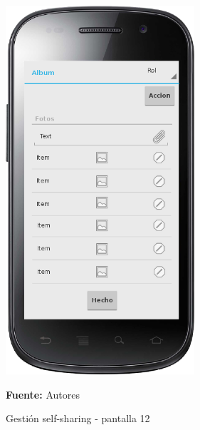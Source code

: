 \begin{figure}[!htb]
  \begin{center}
    \includegraphics[width=7cm]{./imagenes/UI/Self_sharing/self_sharing_12.png}
    \caption{Gestión self-sharing - pantalla 12}
    \label{fig:self_sharing_12}
    \textbf{Fuente:}  Autores
  \end{center}
\end{figure}

